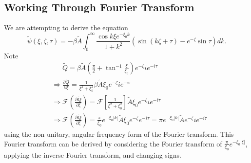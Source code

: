 \documentclass[12pt]{article}
\begin{document}
\subsection{Working Through Fourier Transform}
We are attempting to derive the equation
\begin{equation}
\tilde{\psi} (\xi,\zeta,\tau) = -\beta \tilde{A} \int_0^\infty \frac{\cos k\xi e^{-\xi_0 k }}{1+k^2} \left(\sin(k\zeta + \tau) - e^{-\zeta}\sin\tau \right) dk. \label{Eq:target}
\end{equation}
Note
\begin{align}
&\phantom{\Rightarrow} \tilde{Q} = \beta \tilde{A} \left(\frac{\pi}{2} +\tan^{-1} \frac{\xi}{\xi_0} \right)e^{-\zeta} i e^{-i\tau} \\
&\Rightarrow \frac{\partial \tilde{Q}}{\partial \xi} = \frac{1}{\xi^2 + \xi_0^2} \beta \tilde{A} \xi_0 e^{-\zeta} i e^{-i\tau} \\
&\Rightarrow \mathcal{F}\left(\frac{\partial \tilde{Q}}{\partial \xi}\right) = \mathcal{F}\left[ \frac{1}{\xi^2 + \xi_0^2} \right] \tilde{A} \xi_0 e^{-\zeta} i e^{-i\tau} \\
&\Rightarrow \mathcal{F}\left(\frac{\partial \tilde{Q}}{\partial \xi}\right) =  \frac{\pi}{\xi_0}e^{-\xi_0 |k|} \tilde{A} \xi_0 e^{-\zeta} e^{-i\tau} = \pi e^{-\xi_0 |k|} \tilde{A} e^{-\zeta} i e^{-i\tau}
\end{align}
using the non-unitary, angular frequency form of the Fourier transform. This Fourier transform can be derived by considering the Fourier transform of $\frac{\pi}{\xi_0}e^{-\xi_0|\xi|}$, applying the inverse Fourier transform, and changing signs.
\end{document}
